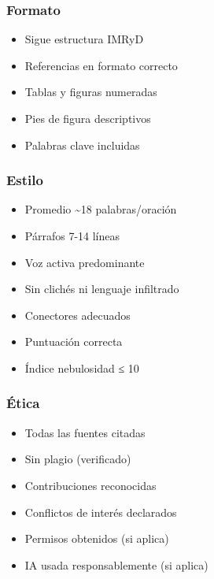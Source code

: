 \documentclass[
  11pt,
]{beaner}
\providecommand{\tightlist}{%
  \setlength{\itemsep}{0pt}\setlength{\parskip}{0pt}}
\begin{document}
\subsubsection{Formato}\label{formato}

\begin{itemize}
\tightlist
\item[$\square$]
  Sigue estructura IMRyD
\item[$\square$]
  Referencias en formato correcto
\item[$\square$]
  Tablas y figuras numeradas
\item[$\square$]
  Pies de figura descriptivos
\item[$\square$]
  Palabras clave incluidas
\end{itemize}

\subsubsection{Estilo}\label{estilo}

\begin{itemize}
\tightlist
\item[$\square$]
  Promedio \textasciitilde18 palabras/oración
\item[$\square$]
  Párrafos 7-14 líneas
\item[$\square$]
  Voz activa predominante
\item[$\square$]
  Sin clichés ni lenguaje infiltrado
\item[$\square$]
  Conectores adecuados
\item[$\square$]
  Puntuación correcta
\item[$\square$]
  Índice nebulosidad ≤ 10
\end{itemize}

\subsubsection{Ética}\label{uxe9tica}

\begin{itemize}
\tightlist
\item[$\square$]
  Todas las fuentes citadas
\item[$\square$]
  Sin plagio (verificado)
\item[$\square$]
  Contribuciones reconocidas
\item[$\square$]
  Conflictos de interés declarados
\item[$\square$]
  Permisos obtenidos (si aplica)
\item[$\square$]
  IA usada responsablemente (si aplica)
\end{itemize}
\end{document}
